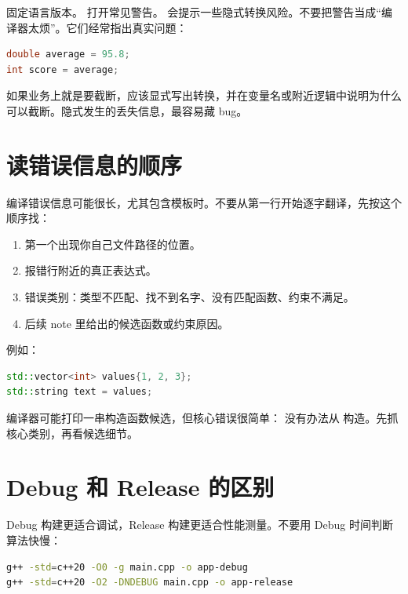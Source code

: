  固定语言版本。 打开常见警告。 会提示一些隐式转换风险。不要把警告当成“编译器太烦”。它们经常指出真实问题：

\begin{lstlisting}[language=C++,caption={隐式转换可能丢信息}]
double average = 95.8;
int score = average;
\end{lstlisting}

如果业务上就是要截断，应该显式写出转换，并在变量名或附近逻辑中说明为什么可以截断。隐式发生的丢失信息，最容易藏 bug。

\section{读错误信息的顺序}

编译错误信息可能很长，尤其包含模板时。不要从第一行开始逐字翻译，先按这个顺序找：

\begin{enumerate}
  \item 第一个出现你自己文件路径的位置。
  \item 报错行附近的真正表达式。
  \item 错误类别：类型不匹配、找不到名字、没有匹配函数、约束不满足。
  \item 后续 note 里给出的候选函数或约束原因。
\end{enumerate}

例如：

\begin{lstlisting}[language=C++,caption={类型不匹配示例}]
std::vector<int> values{1, 2, 3};
std::string text = values;
\end{lstlisting}

编译器可能打印一串构造函数候选，但核心错误很简单： 没有办法从  构造。先抓核心类别，再看候选细节。

\section{Debug 和 Release 的区别}

Debug 构建更适合调试，Release 构建更适合性能测量。不要用 Debug 时间判断算法快慢：

\begin{lstlisting}[language=bash,caption={两种构建模式}]
g++ -std=c++20 -O0 -g main.cpp -o app-debug
g++ -std=c++20 -O2 -DNDEBUG main.cpp -o app-release
\end{lstlisting}

